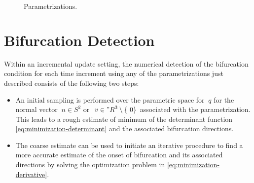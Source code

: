 \documentclass[12pt]{article}
\numberwithin{equation}{section}
\begin{document}
\begin{figure}[htbp]
\begin{center}
    \caption{Parametrizations.}
    \label{fig:parametrizations}
  \end{center}
\end{figure}

\section{Bifurcation Detection}
\label{sec:detection}

Within an incremental update setting, the numerical detection of the
bifurcation condition for each time increment using any of the
parametrizations just described consists of the following two steps:

\begin{itemize}

\item An initial sampling is performed over the
parametric space for $~q$ for the normal vector $~n \in S^2$ or $~v
\in {"R}^3 \setminus \{~0\}$ associated with the
parametrization. This leads to a rough estimate of minimum of the
determinant function \eqref{eq:minimization-determinant} and the
associated bifurcation directions.

\item The coarse estimate can be used to initiate an iterative
procedure to find a more accurate estimate of the onset of bifurcation
and its associated directions by solving the optimization problem in \eqref{eq:minimization-derivative}.

\end{itemize}
\end{document}
